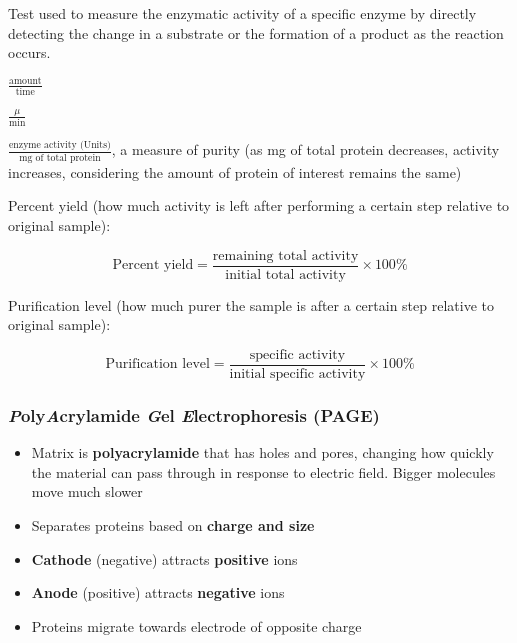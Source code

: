\documentclass[letterpaper, 12pt]{article}
\begin{document}
Test used to measure the enzymatic activity of a specific enzyme by directly detecting the change in a substrate or the formation of a product as the reaction occurs.

\begin{description}
\item [activity] $\displaystyle \frac{\text{amount}}{\text{time}}$
\item [standard enzyme activity, U] $\displaystyle \frac{\mu}{\text{min}}$
\item [specific activity] $\displaystyle \frac{\text{enzyme activity (Units)}}{\text{mg of total protein}}$, a measure of purity (as mg of total protein decreases, activity increases, considering the amount of protein of interest remains the same)

\item {Percent yield} (how much activity is left after performing a certain step relative to original sample):

\begin{equation}
\text{Percent yield} = \frac{\text{remaining total activity}}{\text{initial total activity}} \times 100\%
\end{equation}

\item {Purification level} (how much purer the sample is after a certain step relative to original sample):

\begin{equation}
\text{Purification level} = \frac{\text{specific activity}}{\text{initial specific activity}} \times 100\%
\end{equation}

\end{description}

\subsubsection*{\textit{P}oly\textit{A}crylamide \textit{G}el \textit{E}lectrophoresis (PAGE)}

\begin{itemize}

\item Matrix is \textbf{polyacrylamide} that has holes and pores, changing how quickly the material can pass through in response to electric field. Bigger molecules move much slower
\item Separates proteins based on \textbf{charge and size}
\item \textbf{Cathode} (negative) attracts \textbf{positive} ions
\item \textbf{Anode} (positive) attracts \textbf{negative} ions
\item Proteins migrate towards electrode of opposite charge

\end{itemize}
\end{document}
